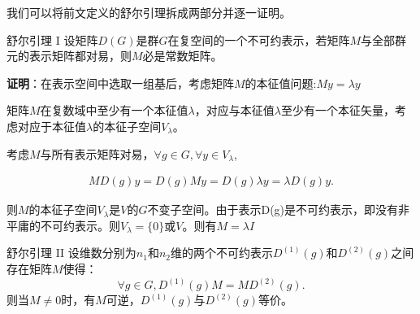 我们可以将前文定义的舒尔引理拆成两部分并逐一证明。

\begin{lemma}{舒尔引理 I}
设矩阵$D(G)$是群$G$在复空间的一个不可约表示，若矩阵$M$与全部群元的表示矩阵都对易，则$M$必是常数矩阵。
\end{lemma}

\textbf{证明}：在表示空间中选取一组基后，考虑矩阵$M$的本征值问题:$My=\lambda y$

矩阵$M$在复数域中至少有一个本征值$\lambda$，对应与本征值$\lambda$至少有一个本征矢量，考虑对应于本征值$\lambda$的本征子空间$V_\lambda$。

考虑$M$与所有表示矩阵对易，$\forall g\in G,\forall y\in V_\lambda$,

\begin{align}
 MD(g)y=D(g)My=D(g)\lambda y=\lambda D(g)y.
\end{align}

则$M$的本征子空间$V_\lambda$是$V$的$G$不变子空间。由于表示D(g)是不可约表示，即没有非平庸的不可约表示。则$V_\lambda=\{0\}$或$V$。则有$M=\lambda I$

\begin{lemma}{舒尔引理 II}
设维数分别为$n_1$和$n_2$维的两个不可约表示$D^{(1)}(g)$和$D^{(2)}(g)$之间存在矩阵$M$使得：
\begin{equation}
\forall g\in G,D^{(1)}(g)M=MD^{(2)}(g).
\end{equation}
则当$M\neq 0$时，有$M$可逆，$D^{(1)}(g)$与$D^{(2)}(g)$等价。
\end{lemma}


